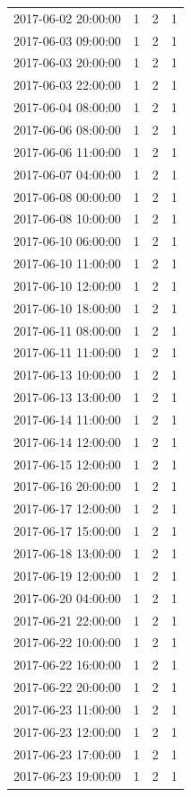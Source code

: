 \begin{tabular}{lrrr}
2017-06-02 20:00:00 & 1 & 2 & 1 \\
2017-06-03 09:00:00 & 1 & 2 & 1 \\
2017-06-03 20:00:00 & 1 & 2 & 1 \\
2017-06-03 22:00:00 & 1 & 2 & 1 \\
2017-06-04 08:00:00 & 1 & 2 & 1 \\
2017-06-06 08:00:00 & 1 & 2 & 1 \\
2017-06-06 11:00:00 & 1 & 2 & 1 \\
2017-06-07 04:00:00 & 1 & 2 & 1 \\
2017-06-08 00:00:00 & 1 & 2 & 1 \\
2017-06-08 10:00:00 & 1 & 2 & 1 \\
2017-06-10 06:00:00 & 1 & 2 & 1 \\
2017-06-10 11:00:00 & 1 & 2 & 1 \\
2017-06-10 12:00:00 & 1 & 2 & 1 \\
2017-06-10 18:00:00 & 1 & 2 & 1 \\
2017-06-11 08:00:00 & 1 & 2 & 1 \\
2017-06-11 11:00:00 & 1 & 2 & 1 \\
2017-06-13 10:00:00 & 1 & 2 & 1 \\
2017-06-13 13:00:00 & 1 & 2 & 1 \\
2017-06-14 11:00:00 & 1 & 2 & 1 \\
2017-06-14 12:00:00 & 1 & 2 & 1 \\
2017-06-15 12:00:00 & 1 & 2 & 1 \\
2017-06-16 20:00:00 & 1 & 2 & 1 \\
2017-06-17 12:00:00 & 1 & 2 & 1 \\
2017-06-17 15:00:00 & 1 & 2 & 1 \\
2017-06-18 13:00:00 & 1 & 2 & 1 \\
2017-06-19 12:00:00 & 1 & 2 & 1 \\
2017-06-20 04:00:00 & 1 & 2 & 1 \\
2017-06-21 22:00:00 & 1 & 2 & 1 \\
2017-06-22 10:00:00 & 1 & 2 & 1 \\
2017-06-22 16:00:00 & 1 & 2 & 1 \\
2017-06-22 20:00:00 & 1 & 2 & 1 \\
2017-06-23 11:00:00 & 1 & 2 & 1 \\
2017-06-23 12:00:00 & 1 & 2 & 1 \\
2017-06-23 17:00:00 & 1 & 2 & 1 \\
2017-06-23 19:00:00 & 1 & 2 & 1 \\

\end{tabular}
